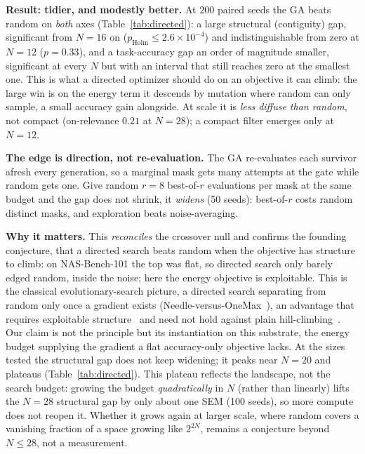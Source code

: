 \documentclass[11pt]{article}
\begin{document}
\textbf{Result: tidier, and modestly better.} At $200$ paired seeds the GA beats random on \emph{both} axes
(Table~\ref{tab:directed}): a large structural (contiguity) gap, significant from $N{=}16$ on
($p_{\mathrm{Holm}}{\leq}2.6{\times}10^{-4}$) and indistinguishable from zero at $N{=}12$
($p{=}0.33$), and a task-accuracy gap an order of magnitude smaller, significant at every $N$ but with
an interval that still reaches zero at the smallest one.
This is what a directed optimizer should do on an objective it can climb: the large win is on the energy term
it descends by mutation where random can only sample, a small accuracy gain alongside. At scale it is
\emph{less diffuse than random}, not compact (on-relevance $0.21$ at $N{=}28$); a compact filter emerges
only at $N{=}12$.

\textbf{The edge is direction, not re-evaluation.} The GA re-evaluates each survivor afresh every generation,
so a marginal mask gets many attempts at the gate while random gets one. Give random $r{=}8$ best-of-$r$
evaluations per mask at the same budget and the gap does not shrink, it \emph{widens} (50 seeds): best-of-$r$
costs random distinct masks, and exploration beats noise-averaging.

\textbf{Why it matters.} This \emph{reconciles} the crossover null and confirms the founding conjecture,
that a directed search beats random when the objective has structure to climb: on NAS-Bench-101 the top was
flat, so directed search only barely edged random, inside the noise; here the energy objective is
exploitable. This is the classical
evolutionary-search picture, a directed search separating from random only once a gradient exists
(Needle-versus-OneMax~\cite{djw2002}), an advantage that requires exploitable structure~\cite{nfl,fdc} and
need not hold against plain hill-climbing~\cite{royalroad}. Our claim is not the principle but its instantiation on this
substrate, the energy budget supplying the gradient a flat accuracy-only objective lacks. At the sizes tested the structural gap does not keep widening; it peaks near
$N{=}20$ and plateaus (Table~\ref{tab:directed}). This plateau reflects the landscape, not the search budget:
growing the budget \emph{quadratically} in $N$ (rather than linearly) lifts the $N{=}28$ structural gap by
only about one SEM (100 seeds), so more compute does not reopen it. Whether it grows again at larger scale,
where random covers a vanishing fraction of a space growing like $2^{2N}$, remains a conjecture beyond
$N{\le}28$, not a measurement.
\end{document}
